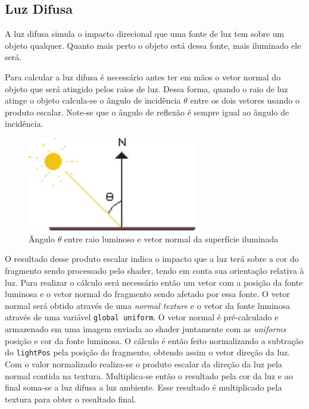 \documentclass[12pt, 
openright, 
oneside, 
a4paper,    
brazil]{facom-ufu-abntex2}
\begin{document}
\subsection{Luz Difusa}
A luz difusa simula o impacto direcional que uma fonte de luz tem sobre um objeto qualquer. Quanto mais perto o objeto está dessa fonte, mais iluminado ele será.

Para calcular a luz difusa é necessário antes ter em mãos o vetor normal do objeto que será atingido pelos raios de luz. Dessa forma, quando o raio de luz atinge o objeto calcula-se o ângulo de incidência $\theta$ entre os dois vetores usando o produto escalar. Note-se que o ângulo de reflexão é sempre igual ao ângulo de incidência.

\begin{figure}[H]
	\centering
	\includegraphics[width=20em]{imagens/normal_reflection.png}
	\caption{Ângulo $\theta$ entre raio luminoso e vetor normal da superfície iluminada}
\end{figure}

O resultado desse produto escalar indica o impacto que a luz terá sobre a cor do fragmento sendo processado pelo shader, tendo em conta sua orientação relativa à luz. Para realizar o cálculo será necessário  então um vetor com a posição da fonte luminosa e o vetor normal do fragmento sendo afetado por essa fonte.
O vetor normal será obtido através de uma \textit{normal texture} e o vetor da fonte luminosa através de uma variável \texttt{global uniform}. O vetor normal é pré-calculado e armazenado em uma imagem enviada ao shader juntamente com as \textit{uniforms} posição e cor da fonte luminosa. O cálculo é então feito normalizando a subtração do \texttt{lightPos} pela posição do fragmento, obtendo assim o vetor direção da luz. Com o valor normalizado realiza-se o produto escalar da direção da luz pela normal contida na textura. Multiplica-se então o resultado pela cor da luz e ao final soma-se a luz difusa a luz ambiente. Esse resultado é multiplicado pela textura para obter o resultado final.
\end{document}
